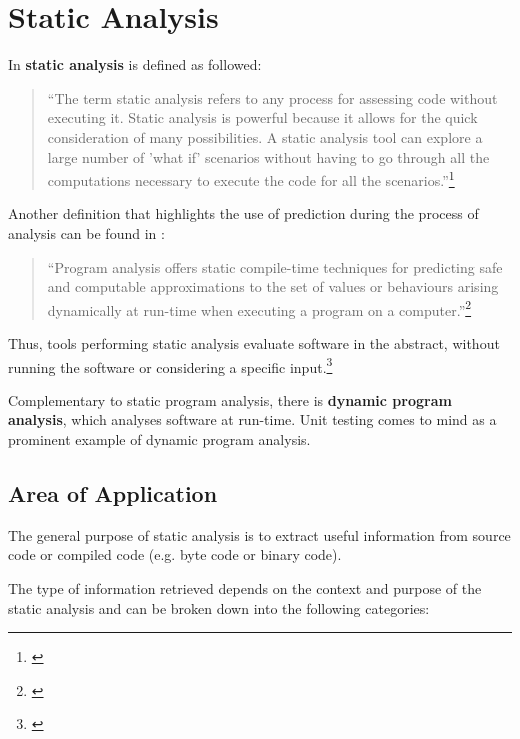 \chapter{Static Analysis}
\label{chap:StaticAnalysis}

In  \textbf{static analysis} is defined as followed:

\begin{quotation}
``The term static analysis refers to any process for assessing code without
executing it. Static analysis is powerful because it allows for the quick consideration of many possibilities. A static analysis tool can explore a large number of 'what if' scenarios without having to go through all the computations
necessary to execute the code for all the scenarios.''\footnote{\citep[3]{SecureProgramming}}
\end{quotation}

Another definition that highlights the use of prediction during the process of analysis can be found in :

\begin{quotation}
``Program analysis offers static compile-time techniques for predicting safe and computable approximations to the set of values or behaviours arising dynamically at run-time when executing a program on a computer.''\footnote{\citep[1]{ProgramAnalysis}}
\end{quotation}

Thus, tools performing static analysis evaluate software in the abstract, without running the software or considering a specific input.\footnote{\citep[1]{UsingSAToFindBugs}}

Complementary to static program analysis, there is \textbf{dynamic program analysis}, which analyses software at run-time. Unit testing comes to mind as a prominent example of dynamic program analysis.

\newpage
\section{Area of Application}
\label{sec:AreaOfApplication}

The general purpose of static analysis is to extract useful information from source code or compiled code (e.g. byte code or binary code).

The type of information retrieved depends on the context and purpose of the static analysis and can be broken down into the following categories:

